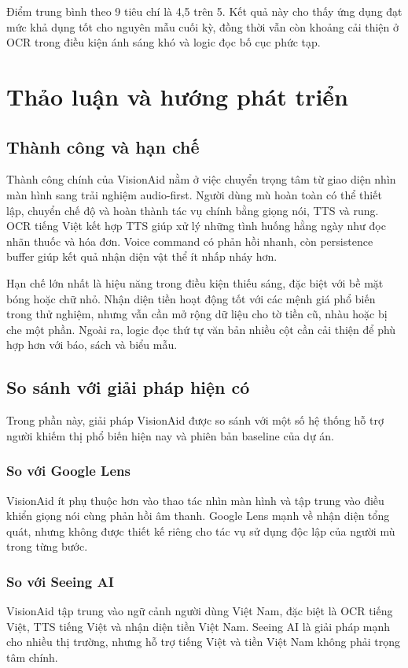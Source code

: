 \documentclass[a4paper,13pt]{report}
\begin{document}
Điểm trung bình theo 9 tiêu chí là 4,5 trên 5. Kết quả này cho thấy ứng dụng đạt mức khả dụng tốt cho nguyên mẫu cuối kỳ, đồng thời vẫn còn khoảng cải thiện ở OCR trong điều kiện ánh sáng khó và logic đọc bố cục phức tạp.

\chapter{Thảo luận và hướng phát triển}

\section{Thành công và hạn chế}

Thành công chính của VisionAid nằm ở việc chuyển trọng tâm từ giao diện nhìn màn hình sang trải nghiệm audio-first. Người dùng mù hoàn toàn có thể thiết lập, chuyển chế độ và hoàn thành tác vụ chính bằng giọng nói, TTS và rung. OCR tiếng Việt kết hợp TTS giúp xử lý những tình huống hằng ngày như đọc nhãn thuốc và hóa đơn. Voice command có phản hồi nhanh, còn persistence buffer giúp kết quả nhận diện vật thể ít nhấp nháy hơn.

Hạn chế lớn nhất là hiệu năng trong điều kiện thiếu sáng, đặc biệt với bề mặt bóng hoặc chữ nhỏ. Nhận diện tiền hoạt động tốt với các mệnh giá phổ biến trong thử nghiệm, nhưng vẫn cần mở rộng dữ liệu cho tờ tiền cũ, nhàu hoặc bị che một phần. Ngoài ra, logic đọc thứ tự văn bản nhiều cột cần cải thiện để phù hợp hơn với báo, sách và biểu mẫu.

\section{So sánh với giải pháp hiện có}

Trong phần này, giải pháp VisionAid được so sánh với một số hệ thống hỗ trợ người khiếm thị phổ biến hiện nay và phiên bản baseline của dự án.

\subsection{So với Google Lens}
VisionAid ít phụ thuộc hơn vào thao tác nhìn màn hình và tập trung vào điều khiển giọng nói cùng phản hồi âm thanh. Google Lens mạnh về nhận diện tổng quát, nhưng không được thiết kế riêng cho tác vụ sử dụng độc lập của người mù trong từng bước.

\subsection{So với Seeing AI}
VisionAid tập trung vào ngữ cảnh người dùng Việt Nam, đặc biệt là OCR tiếng Việt, TTS tiếng Việt và nhận diện tiền Việt Nam. Seeing AI là giải pháp mạnh cho nhiều thị trường, nhưng hỗ trợ tiếng Việt và tiền Việt Nam không phải trọng tâm chính.
\end{document}

